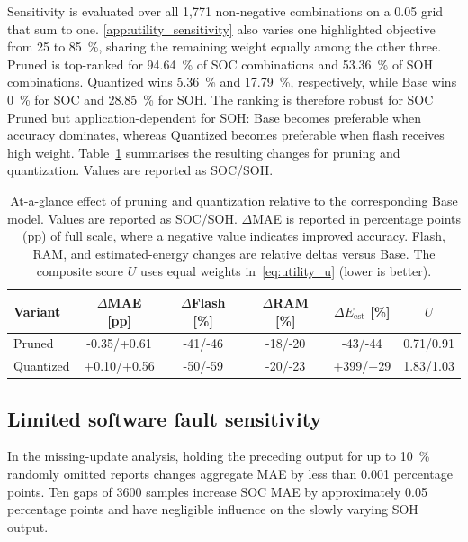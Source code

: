 \documentclass[review]{elsarticle}
\begin{document}
Sensitivity is evaluated over all 1,771 non-negative combinations on a 0.05 grid that sum to one. \ref{app:utility_sensitivity} also varies one highlighted objective from 25 to 85~\%, sharing the remaining weight equally among the other three. Pruned is top-ranked for 94.64~\% of SOC combinations and 53.36~\% of SOH combinations. Quantized wins 5.36~\% and 17.79~\%, respectively, while Base wins 0~\% for SOC and 28.85~\% for SOH. The ranking is therefore robust for SOC Pruned but application-dependent for SOH: Base becomes preferable when accuracy dominates, whereas Quantized becomes preferable when flash receives high weight.
Table~\ref{tab:tradeoff_summary} summarises the resulting changes for pruning and quantization. Values are reported as SOC/SOH.
\begin{table}[tbp]
    \centering
    \caption[Summary of pruning/quantization effects]{At-a-glance effect of pruning and quantization relative to the corresponding Base model. Values are reported as SOC/SOH. $\Delta$MAE is reported in percentage points (pp) of full scale, where a negative value indicates improved accuracy. Flash, RAM, and estimated-energy changes are relative deltas versus Base. The composite score $U$ uses equal weights in~\eqref{eq:utility_u} (lower is better).}
    \label{tab:tradeoff_summary}
    \scriptsize
    \setlength{\tabcolsep}{2.5pt}
    \renewcommand{\arraystretch}{1.05}
    \begin{tabular}{lccccc}
        \toprule
        Variant & $\Delta$MAE [pp] & $\Delta$Flash [\%] & $\Delta$RAM [\%] & $\Delta E_{\mathrm{est}}$ [\%] & $U$ \\
        \midrule
        Pruned & \textcolor{mgGreen}{-0.35}/\textcolor{mgRed}{+0.61} & \textcolor{mgGreen}{-41}/\textcolor{mgGreen}{-46} & \textcolor{mgGreen}{-18}/\textcolor{mgGreen}{-20} & \textcolor{mgGreen}{-43}/\textcolor{mgGreen}{-44} & 0.71/0.91 \\
        Quantized & \textcolor{mgRed}{+0.10}/\textcolor{mgRed}{+0.56} & \textcolor{mgGreen}{-50}/\textcolor{mgGreen}{-59} & \textcolor{mgGreen}{-20}/\textcolor{mgGreen}{-23} & \textcolor{mgRed}{+399}/\textcolor{mgRed}{+29} & 1.83/1.03 \\
        \bottomrule
    \end{tabular}
\end{table}

\subsection{Limited software fault sensitivity}
In the missing-update analysis, holding the preceding output for up to 10~\% randomly omitted reports changes aggregate MAE by less than 0.001 percentage points. Ten gaps of 3600 samples increase SOC MAE by approximately 0.05 percentage points and have negligible influence on the slowly varying SOH output.
\end{document}
